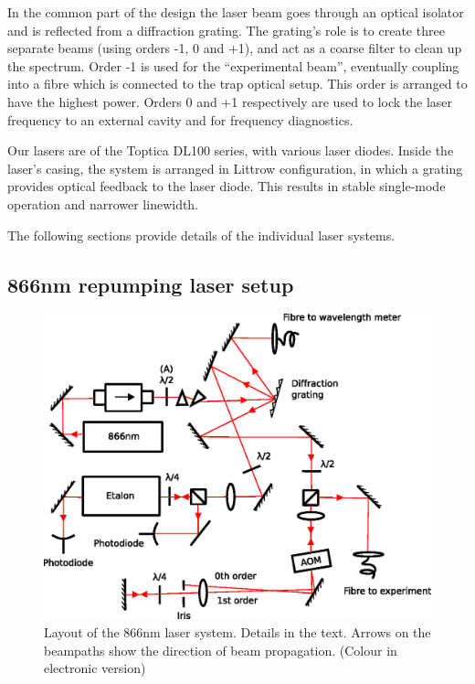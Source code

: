 In the common part of the design the laser beam goes through an optical isolator and is reflected from a diffraction grating. The grating's role is to create three separate beams (using orders -1, 0 and +1), and act as a coarse filter to clean up the spectrum. Order -1 is used for the ``experimental beam'', eventually coupling into a fibre which is connected to the trap optical setup. This order is arranged to have the highest power. Orders 0 and +1 respectively are used to lock the laser frequency to an external cavity and for frequency diagnostics.

Our lasers are of the Toptica DL100 series, with various laser diodes. Inside the laser's casing, the system is arranged in Littrow configuration, in which a grating provides optical feedback to the laser diode. This results in stable single-mode operation and narrower linewidth.

The following sections provide details of the individual laser systems. 


\subsection{866nm repumping laser setup}
\label{subsec:866setup}


\begin{figure}[h!t]
\centering
\includegraphics[width=13cm]{chapter4/866layout/866layout_v3}
\caption[866nm laser layout]{Layout of the 866nm laser system. Details in the text. Arrows on the beampaths show the direction of beam propagation. (Colour in electronic version)}
\label{fig:866layout}
\end{figure} 

